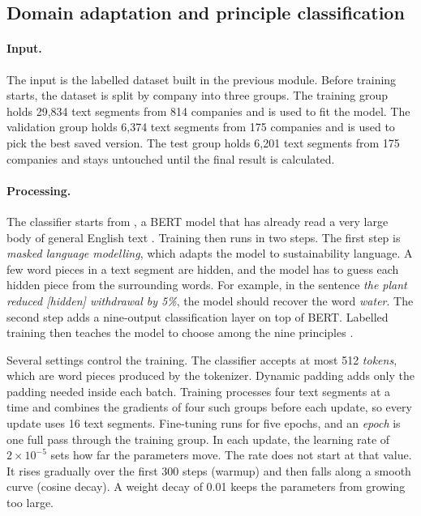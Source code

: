 \subsection{Domain adaptation and principle classification}
\label{sec:classifier}

\paragraph{Input.} The input is the labelled dataset built in the previous module. Before training starts, the dataset is split by company into three groups. The training group holds 29,834 text segments from 814 companies and is used to fit the model. The validation group holds 6,374 text segments from 175 companies and is used to pick the best saved version. The test group holds 6,201 text segments from 175 companies and stays untouched until the final result is calculated.

\paragraph{Processing.} The classifier starts from , a BERT model that has already read a very large body of general English text \cite{devlin2019}. Training then runs in two steps. The first step is \emph{masked language modelling}, which adapts the model to sustainability language. A few word pieces in a text segment are hidden, and the model has to guess each hidden piece from the surrounding words. For example, in the sentence \emph{the plant reduced [hidden] withdrawal by 5\%}, the model should recover the word \emph{water}. The second step adds a nine-output classification layer on top of BERT. Labelled training then teaches the model to choose among the nine principles \cite{gururangan2020}.

Several settings control the training. The classifier accepts at most 512 \emph{tokens}, which are word pieces produced by the tokenizer. Dynamic padding adds only the padding needed inside each batch. Training processes four text segments at a time and combines the gradients of four such groups before each update, so every update uses 16 text segments. Fine-tuning runs for five epochs, and an \emph{epoch} is one full pass through the training group. In each update, the learning rate of $2\times10^{-5}$ sets how far the parameters move. The rate does not start at that value. It rises gradually over the first 300 steps (warmup) and then falls along a smooth curve (cosine decay). A weight decay of 0.01 keeps the parameters from growing too large.

